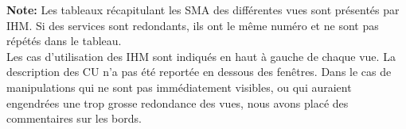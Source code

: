 \begin{shaded}
\textbf{Note: } Les tableaux récapitulant les SMA des différentes vues sont présentés par IHM. Si des services sont redondants, ils ont le même numéro et ne sont pas répétés dans le tableau. \\

Les cas d'utilisation des IHM sont indiqués en haut à gauche de chaque vue. La description des CU n'a pas été reportée en dessous des fenêtres. Dans le cas de manipulations qui ne sont pas immédiatement visibles, ou qui auraient engendrées une trop grosse redondance des vues, nous avons placé des commentaires sur les bords.
\end{shaded}




